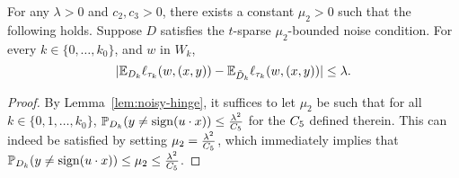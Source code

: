 \begin{lemma}
For any $\lambda > 0$ and $c_2, c_3 > 0$, there exists a constant $\mu_2 > 0$ such that the following holds. Suppose $D$ satisfies the $t$-sparse $\mu_2$-bounded
noise condition. For every $k \in \{0,\ldots,k_0\}$, and $w$ in $W_k$,
\[
| \mathbb{E}_{D_k} \ell_{\tau_k}(w, (x, y)) - \mathbb{E}_{\tilde{D}_k} \ell_{\tau_k}(w, (x, y)) |
\leq
\lambda.
\]
\label{lem:tv-bn}
\end{lemma}
\begin{proof}
By Lemma~\ref{lem:noisy-hinge}, it suffices to let $\mu_2$ be such that for all $k \in \{0,1,\ldots,k_0\}$, $\mathbb{P}_{D_k}(y \neq \operatorname{sign}(u \cdot x)) \leq \frac{\lambda^2}{C_5 }$ for the $C_5$ defined therein.
This can indeed be satisfied by setting $\mu_2 = \frac{\lambda^2}{C_5 }$, which immediately implies that $\mathbb{P}_{D_k}(y \neq \operatorname{sign}(u \cdot x)) \leq \mu_2 \leq \frac{\lambda^2}{C_5 }$.
\end{proof}





